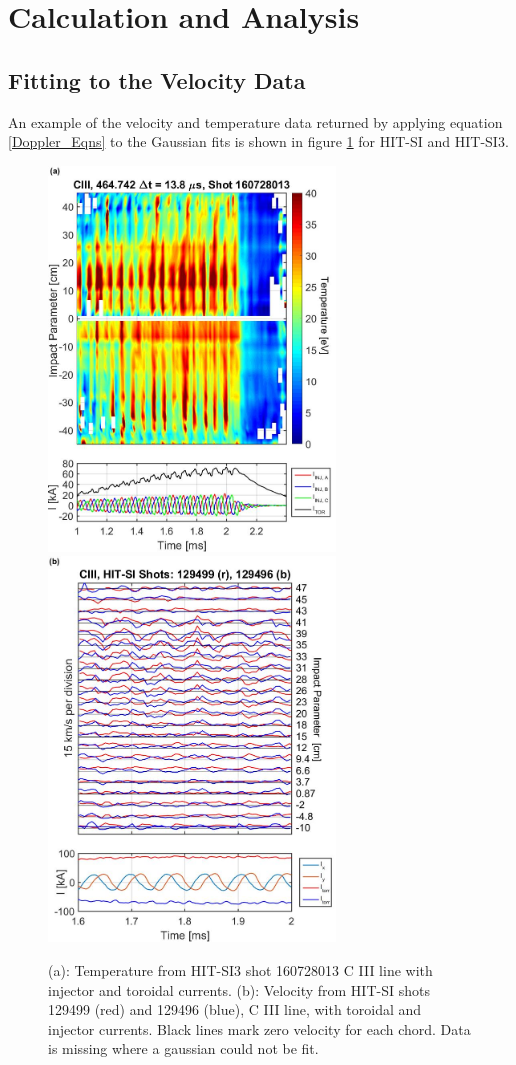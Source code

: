 \section{Calculation and Analysis}\label{sec::Analysis}
\subsection{Fitting to the Velocity Data}\label{sec::DataFit}
\hspace{4ex}An example of the velocity and temperature data returned by applying equation \ref{Doppler_Eqns} to the Gaussian fits is shown in figure \ref{Fig::Raw_VelTemp} for HIT-SI and HIT-SI3.
\begin{figure}
\includegraphics[width=3in]{160728013_Temp_1}\nolinebreak
\includegraphics[width=3in]{129499_Lines_5}\caption{(a): Temperature from HIT-SI3 shot 160728013 C III line with injector and toroidal currents. (b): Velocity from HIT-SI shots 129499 (red) and 129496 (blue), C III line, with toroidal and injector currents. Black lines mark zero velocity for each chord. Data is missing where a gaussian could not be fit.}\label{Fig::Raw_VelTemp}
\end{figure}
